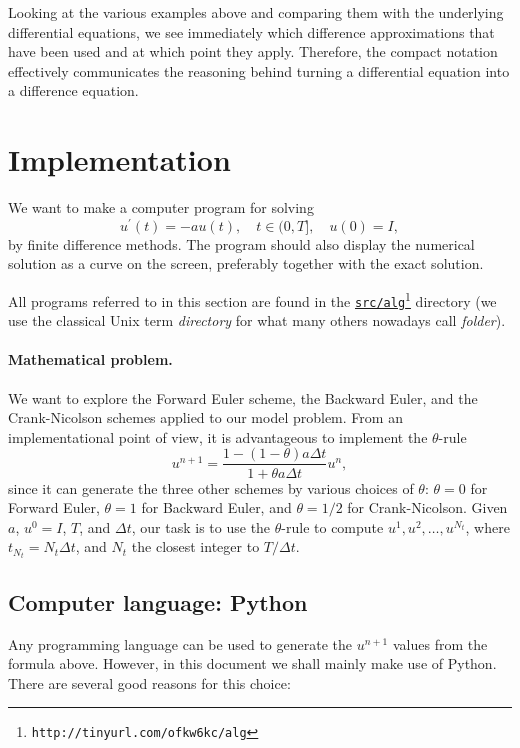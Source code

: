\documentclass[graybox,sectrefs,envcountresetchap,open=right,final]{svmonodo}
\begin{document}
Looking at the various examples above and comparing them with the
underlying differential equations, we see immediately which difference
approximations that have been used and at which point they
apply. Therefore, the compact notation effectively communicates the
reasoning behind turning a differential equation into a difference
equation.


\section{Implementation}
\label{decay:impl1}

We want to make a computer program for solving
\[
u^{\prime}(t) = -au(t),\quad t\in (0,T], \quad u(0)=I,
\]
by finite difference methods. The program should also display
the numerical solution as a curve on the
screen, preferably together with the
exact solution.

 

All programs referred to in this section are found in the
\href{{http://tinyurl.com/ofkw6kc/alg}}{\nolinkurl{src/alg}\footnote{\texttt{http://tinyurl.com/ofkw6kc/alg}}} directory (we use the classical
Unix term \emph{directory} for what many others nowadays call \emph{folder}).

\paragraph{Mathematical problem.}
We want to explore the Forward Euler scheme, the
Backward Euler, and the Crank-Nicolson schemes applied to our model problem.
From an implementational point of view, it is advantageous to
implement the $\theta$-rule
\[
u^{n+1} = \frac{1 - (1-\theta) a\Delta t}{1 + \theta a\Delta t}u^n,
\]
since it can generate the three other schemes by various
choices of $\theta$: $\theta=0$ for Forward Euler, $\theta =1$ for
Backward Euler, and $\theta =1/2$ for Crank-Nicolson.
Given $a$, $u^0=I$, $T$, and $\Delta t$,
our task is to use the $\theta$-rule to
compute $u^1, u^2,\ldots,u^{N_t}$, where $t_{N_t}=N_t\Delta t$, and
$N_t$ the closest integer to $T/\Delta t$.

\subsection{Computer language: Python}

Any programming language can be used to generate the $u^{n+1}$ values from
the formula above. However, in this document we shall mainly make use of
Python. There are several good reasons for this choice:
\end{document}
